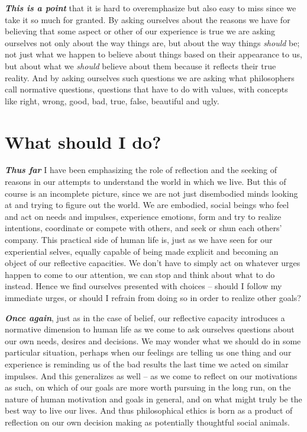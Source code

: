 \documentclass[]{book}
\begin{document}
\textbf{\emph{This is a point}} that it is hard to overemphasize but also easy to miss since we take it so much for granted. By asking ourselves about the reasons we have for believing that some aspect or other of our experience is true we are asking ourselves not only about the way things are, but about the way things \emph{should} be; not just what we happen to believe about things based on their appearance to us, but about what we \emph{should} believe about them because it reflects their true reality. And by asking ourselves such questions we are asking what philosophers call normative questions, questions that have to do with values, with concepts like right, wrong, good, bad, true, false, beautiful and ugly.

\hypertarget{what-should-i-do}{%
\section{What should I do?}\label{what-should-i-do}}

\textbf{\emph{Thus far}} I have been emphasizing the role of reflection and the seeking of reasons in our attempts to understand the world in which we live. But this of course is an incomplete picture, since we are not just disembodied minds looking at and trying to figure out the world. We are embodied, social beings who feel and act on needs and impulses, experience emotions, form and try to realize intentions, coordinate or compete with others, and seek or shun each others' company. This practical side of human life is, just as we have seen for our experiential selves, equally capable of being made explicit and becoming an object of our reflective capacities. We don't have to simply act on whatever urges happen to come to our attention, we can stop and think about what to do instead. Hence we find ourselves presented with choices -- should I follow my immediate urges, or should I refrain from doing so in order to realize other goals?

\textbf{\emph{Once again}}, just as in the case of belief, our reflective capacity introduces a normative dimension to human life as we come to ask ourselves questions about our own needs, desires and decisions. We may wonder what we should do in some particular situation, perhaps when our feelings are telling us one thing and our experience is reminding us of the bad results the last time we acted on similar impulses. And this generalizes as well -- as we come to reflect on our motivations as such, on which of our goals are more worth pursuing in the long run, on the nature of human motivation and goals in general, and on what might truly be the best way to live our lives. And thus philosophical ethics is born as a product of reflection on our own decision making as potentially thoughtful social animals.
\end{document}
